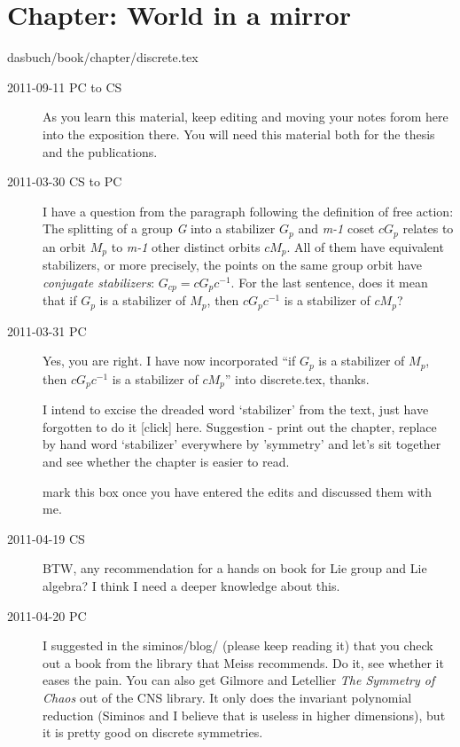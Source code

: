 \section{Chapter: World in a mirror}
\label{c-discrete}\noindent dasbuch/book/chapter/discrete.tex
\begin{description}

\item[2011-09-11 PC to  CS] As you learn this material, keep editing
 and moving your notes forom here into the exposition there.
You will need this material both for the thesis and the publications.

\item[2011-03-30  CS to PC]
I have a question from the paragraph
following the definition of free action: The splitting of a group
\emph{G} into a stabilizer \emph{$G_{p}$} and \emph{m-1} coset
\emph{$cG_{p}$} relates to an orbit \emph{$M_{p}$} to \emph{m-1} other
distinct orbits \emph{$cM_{p}$}. All of them have equivalent stabilizers,
or more precisely, the points on the same group orbit have
\emph{conjugate stabilizers}: \emph{$G_{cp} = cG_{p}c^{-1}$}. For the
last sentence, does it mean that if \emph{$G_{p}$}  is a stabilizer of
\emph{$M_{p}$}, then \emph{$cG_{p}c^{-1}$} is a stabilizer of
\emph{$cM_{p}$}?

\item[2011-03-31 PC] Yes, you are right. I have now incorporated ``if
\emph{$G_{p}$}  is a stabilizer of \emph{$M_{p}$}, then
\emph{$cG_{p}c^{-1}$} is a stabilizer of \emph{$cM_{p}$}'' into
discrete.tex, thanks.

I intend to excise the dreaded word `stabilizer' from the text, just have
forgotten to do it
{[click]} here. Suggestion - print out the chapter, replace by hand word
`stabilizer' everywhere by 'symmetry' and let's sit together and see
whether the chapter is  easier to read.

 mark this box once you have entered the
edits and discussed them with me.

\item[2011-04-19 CS]
BTW, any recommendation for a hands on book for Lie group and Lie
algebra? I think I need a deeper knowledge about this.

\item[2011-04-20 PC] I suggested in the siminos/blog/ (please keep reading it)
that you check out a book from the library that Meiss recommends. Do it, see
whether it eases the pain. You can also get
Gilmore and Letellier
{\em The Symmetry of Chaos} out of the CNS library. It only does the
invariant polynomial reduction (Siminos and I believe that is useless in
higher dimensions), but it is pretty good on discrete symmetries.

\end{description}


